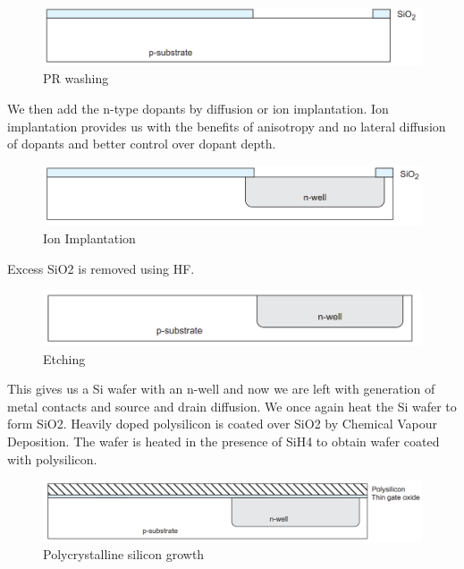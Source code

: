 \begin{figure}[H]
\centering
\includegraphics[scale=0.3]{./fig9} %
\caption{PR washing}
\label{3.9} %
\end{figure}
 
\noindent We then add the n-type dopants by diffusion or ion implantation. Ion implantation provides us with the benefits of anisotropy and no lateral diffusion of dopants and better control over dopant depth.

\begin{figure}[htb]
\centering
\includegraphics[scale=0.3]{./fig10} %
\caption{Ion Implantation}
\label{3.10} %
\end{figure}
 
\noindent Excess SiO2 is removed using HF.
\begin{figure}[htb]
\centering
\includegraphics[scale=0.3]{./fig11} %
\caption{Etching}
\label{3.11} %
\end{figure}
 
\noindent This gives us a Si wafer with an n-well and now we are left with generation of metal contacts and source and drain diffusion.
We once again heat the Si wafer to form SiO2. Heavily doped polysilicon is coated over SiO2 by Chemical Vapour Deposition. The wafer is heated in the presence of SiH4 to obtain wafer coated with polysilicon. 
\begin{figure}[H]
\centering
\includegraphics[scale=0.3]{./fig12} %
\caption{Polycrystalline silicon growth}
\label{3.12} %
\end{figure}




